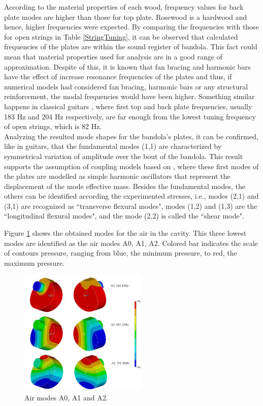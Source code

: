 According to the material properties of each wood, frequency values for back plate modes are higher than those for top plate. Rosewood is a hardwood and hence, higher frequencies were expected. By comparing the frequencies with those for open strings in Table \ref{StringTuning}, it can be observed that calculated frequencies of the plates are within the sound register of bandola. This fact could mean that material properties used for analysis are in a good range of approximation. Despite of this, it is known that fan bracing and harmonic bars have the effect of increase resonance frequencies of the plates and thus, if numerical models had considered fan bracing, harmonic bars or any structural reinforcement, the modal frequencies would have been higher. Something similar happens in classical guitars \cite{Rossing}, where first top and back plate frequencies, usually {183 Hz} and {204 Hz} respectively, are far enough from the lowest tuning frequency of open strings, which is {82 Hz}.\\

Analyzing the resulted mode shapes for the bandola's plates, it can be confirmed, like in guitars, that the fundamental modes (1,1) are characterized by symmetrical variation of amplitude over the bout of the bandola. This result supports the assumption of coupling models based on \cite{Christensen, Christensen3}, where these first modes of the plates are modelled as simple harmonic oscillators that represent the displacement of the mode effective mass. Besides the fundamental modes, the others can be identified according the experimented stresses, i.e., modes (2,1) and (3,1) are recognized as ``transverse flexural modes", modes (1,2) and (1,3) are the ``longitudinal flexural modes", and the mode (2,2) is called the ``shear mode".

Figure \ref{AirModes13} shows the obtained modes for the air in the cavity. This three lowest modes are identified as the air modes A0, A1, A2. Colored bar indicates the scale of contours pressure, ranging from blue, the minimum pressure, to red, the maximum pressure.

\begin{figure}[h]
\centering
\includegraphics[height=6cm]{img/AirModes13.png}
\caption{Air modes A0, A1 and A2.}
\label{AirModes13}
\end{figure}

